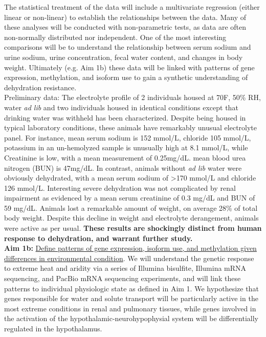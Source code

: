 \documentclass[12pt]{article}
\begin{document}
The statistical treatment of the data will include a multivariate regression (either linear or non-linear) to establish the relationships between the data. Many of these analyses will be conducted with non-parametric tests, as data are often non-normally distributed nor independent. One of the most interesting comparisons will be to understand the relationship between serum sodium and urine sodium, urine concentration, fecal water content, and changes in body weight. Ultimately (e.g. Aim 1b) these data will be linked with patterns of gene expression, methylation, and isoform use to gain a synthetic understanding of dehydration resistance. \\




%
%


Preliminary data: The electrolyte profile of 2 individuals housed at 70F, 50\% RH, water \textit{ad lib} and two individuals housed in identical conditions except that drinking water was withheld has been characterized. Despite being housed in typical laboratory conditions, these animals have remarkably unusual electrolyte panel. For instance, mean serum sodium is 152 mmol/L, chloride 105 mmol/L, potassium in an un-hemolyzed sample is unusually high at 8.1 mmol/L, while Creatinine is low, with a mean measurement of 0.25mg/dL. mean blood urea nitrogen (BUN) is 47mg/dL. In contrast, animals without \textit{ad lib} water were obviously dehydrated, with a mean serum sodium of \textgreater 170 mmol/L and chloride 126 mmol/L. Interesting severe dehydration was not complicated by renal impairment as evidenced by a mean serum creatinine of 0.3 mg/dL and BUN of 59 mg/dL. Animals lost a remarkable amount of weight, on average 28\% of total body weight. Despite this decline in weight and electrolyte derangement, animals were active as per usual. \textbf{These results are shockingly distinct from human response to dehydration, and warrant further study.}  \\  

\noindent \textbf{Aim 1b:} \ul{Define patterns of gene expression, isoform use, and methylation given differences in environmental condition}. {We will understand the genetic response to extreme heat and aridity via a series of Illumina bisulfite, Illumina mRNA sequencing, and PacBio mRNA sequencing experiments, and will link these patterns to individual physiologic state as defined in Aim 1.} We hypothesize that genes responsible for water and solute transport will be particularly active in the most extreme conditions in renal and pulmonary tissues, while genes involved in the activation of the hypothalamic-neurohypophysial system will be differentially regulated in the hypothalamus.\\
\end{document}
